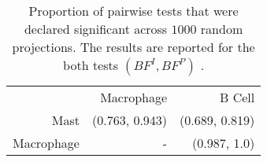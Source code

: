 \documentclass[12pt]{article}
\theoremstyle{plain}%
\theoremstyle{definition}
\begin{document}
\begin{table}[ht]
\centering
\caption{Proportion of pairwise tests that were declared significant across $1000$ random projections. The results are reported for the both tests $(BF^{I}, BF^{P})$ .}
\label{tab:table7a}
\begin{tabular}{|rrr|}
  \hline
   & Macrophage & B Cell \\
    Mast & (0.763, 0.943)  & (0.689, 0.819) \\
    Macrophage & - & (0.987, 1.0)  \\
  \hline
\end{tabular}
\end{table}



\end{document}
